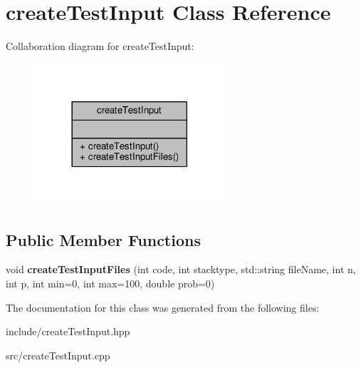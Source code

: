 \hypertarget{classcreate_test_input}{}\section{create\+Test\+Input Class Reference}
\label{classcreate_test_input}


Collaboration diagram for create\+Test\+Input\+:
\nopagebreak
\begin{figure}[H]
\begin{center}
\leavevmode
\includegraphics[width=201pt]{classcreate_test_input__coll__graph}
\end{center}
\end{figure}
\subsection*{Public Member Functions}
\begin{DoxyCompactItemize}
\item 
void {\bfseries create\+Test\+Input\+Files} (int code, int stacktype, std\+::string file\+Name, int n, int p, int min=0, int max=100, double prob=0)\hypertarget{classcreate_test_input_a28ea5139369c516837187beaa44b141c}{}\label{classcreate_test_input_a28ea5139369c516837187beaa44b141c}

\end{DoxyCompactItemize}


The documentation for this class was generated from the following files\+:\begin{DoxyCompactItemize}
\item 
include/create\+Test\+Input.\+hpp\item 
src/create\+Test\+Input.\+cpp\end{DoxyCompactItemize}

